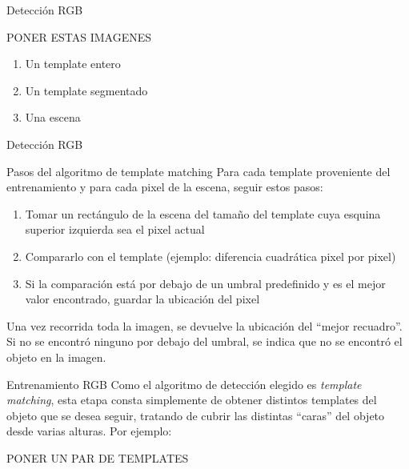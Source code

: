 \documentclass[]{beamer}
\begin{document}
\begin{frame}[t]{Detección RGB}

    PONER ESTAS IMAGENES
    \begin{enumerate}
        \item Un template entero
        \item Un template segmentado
        \item Una escena
    \end{enumerate}
\end{frame}



\begin{frame}[t]{Detección RGB}
    \begin{block}{Pasos del algoritmo de template matching}
        Para cada template proveniente del entrenamiento y para cada pixel de la escena, seguir estos pasos:
        \begin{enumerate}
            \item Tomar un rectángulo de la escena del tamaño del template cuya esquina superior izquierda sea el pixel actual
            \item Compararlo con el template (ejemplo: diferencia cuadrática pixel por pixel)
            \item Si la comparación está por debajo de un umbral predefinido y es el mejor valor encontrado, guardar la ubicación del pixel
        \end{enumerate}
        Una vez recorrida toda la imagen, se devuelve la ubicación del ``mejor recuadro''. Si no se encontró ninguno por debajo del umbral, se indica que no se encontró el objeto en la imagen.
    \end{block}
\end{frame}


\begin{frame}[t]{Entrenamiento RGB}
    Como el algoritmo de detección elegido es \textit{template matching}, esta etapa consta simplemente de obtener distintos templates del objeto que se desea seguir, tratando de cubrir las distintas ``caras'' del objeto desde varias alturas. Por ejemplo:
    \begin{block}{}
        PONER UN PAR DE TEMPLATES
    \end{block}
\end{frame}
\end{document}
